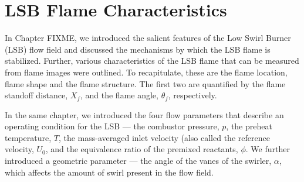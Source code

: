 \chapter{LSB Flame Characteristics}







In Chapter FIXME, we introduced the salient features of the Low Swirl Burner (LSB) flow field and discussed the mechanisms by which the LSB flame is stabilized.
Further, various characteristics of the LSB flame that can be measured from flame images were outlined.
To recapitulate, these are the flame location, flame shape and the flame structure.
The first two are quantified by the flame standoff distance, \(X_f\), and the flame angle, \(\theta_f\), respectively.

In the same chapter, we introduced the four flow parameters that describe an operating condition for the LSB --- the combustor pressure, \(p\), the preheat temperature, \(T\), the mass-averaged inlet velocity (also called the reference velocity, \(U_0\), and the equivalence ratio of the premixed reactants, \(\phi\).
We further introduced a geometric parameter --- the angle of the vanes of the swirler, \(\alpha\), which affects the amount of swirl present in the flow field.

